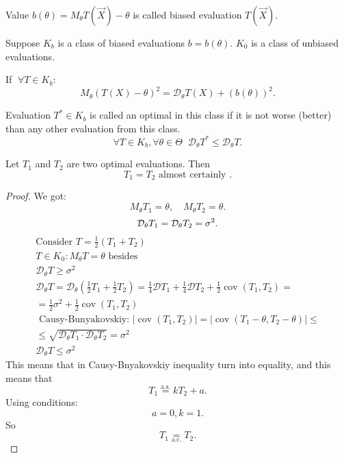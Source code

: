 \begin{definition}
    Value $b(\theta) = M_{\theta} T(\vec{X}) - \theta $
    is called biased evaluation $T\left( \vec{X} \right) $.
\end{definition}
Suppose $K_b$ is a class of biased evaluations $b = b(\theta)$.
$K_0$ is a class of unbiased evaluations.

\begin{remark}
    If $ \; \forall T \in K_b$:
    \[
    M_{\theta} \left( T(X) - \theta \right) ^2 =
    \mathcal{D}_{\theta} T(X) + \left( b(\theta) \right) ^2
    .\] 
\end{remark}

\begin{definition}
    Evaluation $T^* \in K_b$ is called an optimal in this class
    if it is not worse (better) than any other evaluation
    from this class.
    \[
    \forall T \in K_b, \forall \theta \in \Theta  \;\; \mathcal{D}_{\theta} T^* \leq \mathcal{D}_{\theta} T
    .\] 
\end{definition}

\begin{theorem}
    Let $T_1$ and $T_2$ are two optimal evaluations. Then \[
    T_1 = T_2 \text{ almost certainly }
    .\] 
\end{theorem}
\begin{proof}
    We got:
    \[
        M_{\theta}T_1 = \theta, \quad M_{\theta}T_2 = \theta
    .\] 
    \[
        \mathcal{D_{\theta}} T_1 = \mathcal{D}_{\theta} T_2 = \sigma^2 \\
    .\] 
    \begin{gather*}
        \text{Consider } T = \frac{1}{2} \left( T_1 + T_2 \right) \\
        T \in K_0 : M_{\theta} T = \theta \text{ besides } \\
        \mathcal{D}_{\theta} T \geq \sigma^2 \\
        \mathcal{D}_{\theta} T = \mathcal{D}_{\theta}
        \left( \frac{1}{2} T_1 + \frac{1}{2} T_2 \right) =
        \frac{1}{4} \mathcal{D} T_1 + \frac{1}{4} \mathcal{D}T_2 +
        \frac{1}{2} \operatorname{cov}(T_1, T_2) = \\
        = \frac{1}{2} \sigma^2 + \frac{1}{2} \operatorname{cov}(T_1, T_2) \\
        \text{ Causy-Bunyakovskiy: }
        \left| \operatorname{cov}(T_1, T_2) \right| =
        \left| \operatorname{cov}(T_1 - \theta, T_2 - \theta) \right|  \leq \\
        \leq \sqrt{\mathcal{D}_{\theta} T_1 \cdot
        \mathcal{D}_{\theta}T_2}  = \sigma^2 \\
        \mathcal{D}_{\theta}T \leq \sigma^2
    \end{gather*}
    This means that in Causy-Bnyakovskiy inequality turn into equality, and this means that \[
    T_1 \overset{\text{a.s.}}{=} k T_2 + a
    .\] 
    Using conditions:
    \[
    a = 0, k = 1
    .\] 
    So
    \[
    T_1 \underset{\text{a.c.}}{=} T_2
    .\] 
\end{proof}




